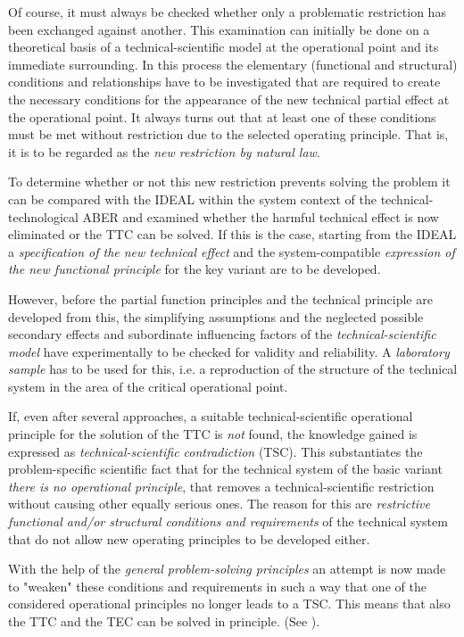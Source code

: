 \documentclass[11pt,a4paper]{article}
\begin{document}
Of course, it must always be checked whether only a problematic restriction
has been exchanged against another. This examination can initially be done on
a theoretical basis of a technical-scientific model at the operational point
and its immediate surrounding.  In this process the elementary (functional and
structural) conditions and relationships have to be investigated that are
required to create the necessary conditions for the appearance of the new
technical partial effect at the operational point. It always turns out that at
least one of these conditions must be met without restriction due to the
selected operating principle. That is, it is to be regarded as the \emph{new
  restriction by natural law}.

To determine whether or not this new restriction prevents solving the problem
it can be compared with the IDEAL within the system context of the
technical-technological ABER and examined whether the harmful technical effect
is now eliminated or the TTC can be solved.  If this is the case, starting
from the IDEAL a \emph{specification of the new technical effect} and the
system-compatible \emph{expression of the new functional principle} for the
key variant are to be developed.

However, before the partial function principles and the technical principle
are developed from this, the simplifying assumptions and the neglected
possible secondary effects and subordinate influencing factors of the
\emph{technical-scientific model} have experimentally to be checked for
validity and reliability.  A \emph{laboratory sample} has to be used for this,
i.e. a reproduction of the structure of the technical system in the area of
the critical operational point.

If, even after several approaches, a suitable technical-scientific operational
principle for the solution of the TTC is \emph{not} found, the knowledge
gained is expressed as \emph{technical-scientific contradiction} (TSC). This
substantiates the problem-specific scientific fact that for the technical
system of the basic variant \emph{there is no operational principle}, that
removes a technical-scientific restriction without causing other equally
serious ones.  The reason for this are \emph{restrictive functional and/or
  structural conditions and requirements} of the technical system that do not
allow new operating principles to be developed either.

With the help of the \emph{general problem-solving principles} an attempt is
now made to "weaken" these conditions and requirements in such a way that one
of the considered operational principles no longer leads to a TSC.  This means
that also the TTC and the TEC can be solved in principle. (See
\cite[A.9]{RM-21}).
\end{document}
